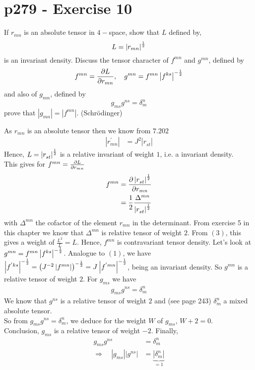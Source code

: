\section{p279 - Exercise 10}
\begin{tcolorbox}
If $r_{mn}$ is an absolute tensor in $4-$space, show that $L$ defined by,
$$L=\left|r_{mn}\right|^{\frac{1}{2}}$$
is an invariant density. Discuss the tensor character of $f^{mn}$ and $g^{mn}$, defined by
$$f^{mn}=\pdv{L}{r_{mn}}, \quad g^{mn} = f^{mn}\left|f^{ks}\right|^{-\frac{1}{2}}$$
and also of $g_{mn}$, defined by
$$g_{ms}g^{ns}= \delta_m^n$$
prove that $\left|g_{mn}\right| = \left|f^{mn}\right|$. (Schrödinger)
\end{tcolorbox}
As $r_{mn}$ is an absolute tensor then we know from $\mathbf{7.202}$ 
\begin{align}
\left|r^{'}_{mn}\right|&= J^2\left|r^{}_{st}\right|
\end{align}
Hence, $L=\left|r^{}_{st}\right|^{\frac{1}{2}}$ is a relative invariant of weight $1$, i.e. a invariant density.\\
This gives for $f^{mn}=\pdv{L}{r_{mn}}$
\begin{align}
f^{mn}&= \pdv{\left|r^{}_{st}\right|^{\ensuremath{\frac{1}{2}}}}{r_{mn}}\\
&= \frac{1}{2} \frac{\Delta^{mn}}{\left|r^{}_{st}\right|^{\frac{1}{2}}}
\end{align}
with $\Delta^{mn}$ the cofactor of the element $r_{mn}$ in the determinant. From exercise 5 in this chapter we know that $\Delta^{mn}$ is relative tensor of weight $2$. From $(3)$, this  gives a weight of $\frac{L^2}{L}= L$. Hence, $f^{mn}$ is contravariant tensor density.
Let's look at $g^{mn} = f^{mn}\left|f^{ks}\right|^{-\frac{1}{2}}$. Analogue to $(1)$, we have $\left|f^{'ks}\right|^{-\frac{1}{2}} = \left(J^{-2}\left|f^{mn}\right|\right)^{-\frac{1}{2}}=J^{}\left|f^{'mn}\right|^{-\frac{1}{2}}$, being an invariant density. So $g^{mn}$ is a relative tensor of weight $2$.
For  $g_{ms}$ we have 
\begin{align}
g_{ms}g^{ns}= \delta_m^n
\end{align}
We know that $g^{ns}$ is a relative tensor of weight $2$ and (see page 243) $\delta_m^n$ a mixed absolute tensor.\\
So from $g_{ms}g^{ns}= \delta_m^n$, we deduce for the weight $W$ of $g_{ms}$, $W+2 = 0$.\\
Conclusion, $g_{ms}$ is a relative tensor of weight $-2$.
Finally, 
\begin{align}
g_{ms}g^{ns}&= \delta_m^n\\
\Rightarrow \quad \left|g_{ms}\right|\left|g^{ns}\right|&=\underbrace{\left|\delta_m^n\right|}_{=1}
\end{align}

